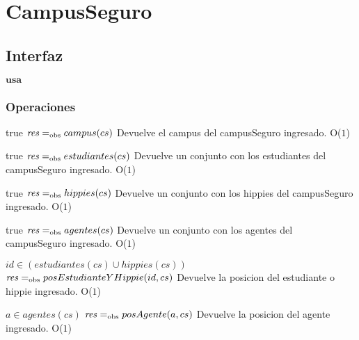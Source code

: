 
\section{CampusSeguro}

\subsection{Interfaz}

$\textbf{usa}$  


\subsubsection*{Operaciones}



 {true}
 {$\text{\textit{res}} =_{\mathrm{obs}} campus(cs)$}
 {Devuelve el campus del campusSeguro ingresado.}
 {O($1$)}
 {}
 
 {true}
 {$\text{\textit{res}} =_{\mathrm{obs}} estudiantes(cs)$}
 {Devuelve un conjunto con los estudiantes del campusSeguro ingresado.}
 {O($1$)}
 {}
 
 {true}
 {$\text{\textit{res}} =_{\mathrm{obs}} hippies(cs)$}
 {Devuelve un conjunto con los hippies del campusSeguro ingresado.}
 {O($1$)}
 {}

 {true}
 {$\text{\textit{res}} =_{\mathrm{obs}} agentes(cs)$}
 {Devuelve un conjunto con los agentes del campusSeguro ingresado.}
 {O($1$)}
 {}
 
 {$id \in (estudiantes(cs) \cup hippies(cs))$}
 {$\text{\textit{res}} =_{\mathrm{obs}} posEstudianteYHippie(id, cs)$}
 {Devuelve la posicion del estudiante o hippie ingresado.}
 {O($1$)}
 {}

 {$a \in agentes(cs)$}
 {$\text{\textit{res}} =_{\mathrm{obs}} posAgente(a, cs)$}
 {Devuelve la posicion del agente ingresado.}
 {O($1$)}
 {}
 
